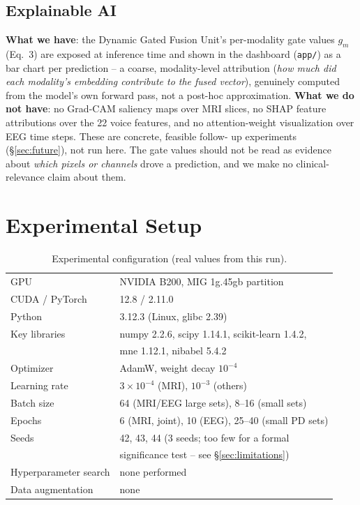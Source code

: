\documentclass[conference]{IEEEtran}
\begin{document}
\subsection{Explainable AI}
\label{sec:xai}
\textbf{What we have}: the Dynamic Gated Fusion Unit's per-modality gate
values $g_m$ (Eq.~3) are exposed at inference time and shown in the
dashboard (\texttt{app/}) as a bar chart per prediction -- a coarse,
modality-level attribution (\emph{how much did each modality's embedding
contribute to the fused vector}), genuinely computed from the model's
own forward pass, not a post-hoc approximation.
\textbf{What we do not have}: no Grad-CAM \cite{selvaraju2017gradcam}
saliency maps over MRI slices, no SHAP \cite{lundberg2017shap} feature
attributions over the 22 voice features, and no attention-weight
visualization over EEG time steps. These are concrete, feasible follow-
up experiments (\S\ref{sec:future}), not run here. The gate values
should not be read as evidence about \emph{which pixels or channels}
drove a prediction, and we make no clinical-relevance claim about them.

\section{Experimental Setup}
\label{sec:setup}

\begin{table}[!t]
\centering
\caption{Experimental configuration (real values from this run).}
\label{tab:expsetup}
\small
\begin{tabular}{ll}
\toprule
GPU & NVIDIA B200, MIG 1g.45gb partition \\
CUDA / PyTorch & 12.8 / 2.11.0 \\
Python & 3.12.3 (Linux, glibc 2.39) \\
Key libraries & numpy 2.2.6, scipy 1.14.1, scikit-learn 1.4.2, \\
              & mne 1.12.1, nibabel 5.4.2 \\
Optimizer & AdamW, weight decay $10^{-4}$ \\
Learning rate & $3\times10^{-4}$ (MRI), $10^{-3}$ (others) \\
Batch size & 64 (MRI/EEG large sets), 8--16 (small sets) \\
Epochs & 6 (MRI, joint), 10 (EEG), 25--40 (small PD sets) \\
Seeds & 42, 43, 44 (3 seeds; too few for a formal \\
      & significance test -- see \S\ref{sec:limitations}) \\
Hyperparameter search & none performed \\
Data augmentation & none \\
\bottomrule
\end{tabular}
\end{table}
\end{document}
